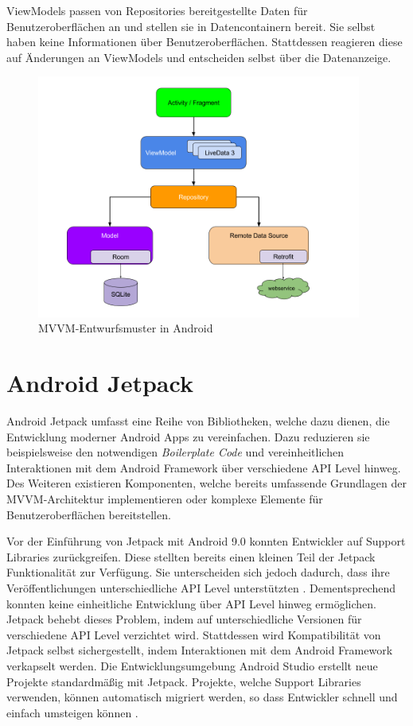 ViewModels passen von Repositories bereitgestellte Daten für Benutzeroberflächen an und stellen sie in Datencontainern bereit.
Sie selbst haben keine Informationen über Benutzeroberflächen.
Stattdessen reagieren diese auf Änderungen an ViewModels und entscheiden selbst über die Datenanzeige.

\begin{figure}
	\centering
	\includegraphics[height=8cm,keepaspectratio]{./img/android-architecture.png}
	\caption{MVVM-Entwurfsmuster in Android \autocite{androidarchitecture}}
	\label{fig:app:architecture:mvvm}
\end{figure}

\section{Android Jetpack}
\label{sec:app:jetpack}
Android Jetpack umfasst eine Reihe von Bibliotheken, welche dazu dienen, die Entwicklung moderner Android Apps zu vereinfachen.
Dazu reduzieren sie beispielsweise den notwendigen \textit{Boilerplate Code} und vereinheitlichen Interaktionen mit dem Android Framework über verschiedene API Level hinweg.
Des Weiteren existieren Komponenten, welche bereits umfassende Grundlagen der MVVM-Architektur implementieren oder komplexe Elemente für Benutzeroberflächen bereitstellen.

Vor der Einführung von Jetpack mit Android 9.0 konnten Entwickler auf Support Libraries zurückgreifen.
Diese stellten bereits einen kleinen Teil der Jetpack Funktionalität zur Verfügung.
Sie unterscheiden sich jedoch dadurch, dass ihre Veröffentlichungen unterschiedliche API Level unterstützten \autocite{supportlibrariesversions}.
Dementsprechend konnten keine einheitliche Entwicklung über API Level hinweg ermöglichen.
Jetpack behebt dieses Problem, indem auf unterschiedliche Versionen für verschiedene API Level verzichtet wird.
Stattdessen wird Kompatibilität von Jetpack selbst sichergestellt, indem Interaktionen mit dem Android Framework verkapselt werden.
Die Entwicklungsumgebung Android Studio erstellt neue Projekte standardmäßig mit Jetpack.
Projekte, welche Support Libraries verwenden, können automatisch migriert werden, so dass Entwickler schnell und einfach umsteigen können \autocite{androidxmigration}.

